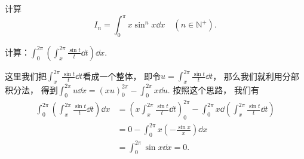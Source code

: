 \begin{example}
计算\[
	I_n = \int_0^\pi x \sin^n x \dd{x}
	\quad(n\in\mathbb{N}^+).
\]
\end{example}

\begin{example}
计算：\(\int_0^{2\pi}\left(\int_x^{2\pi}\frac{\sin t}{t}\dd{t}\right)\dd{x}\).
\begin{solution}
这里我们把\(\int_x^{2\pi}\frac{\sin t}{t}\dd{t}\)看成一个整体，
即令\(u = \int_x^{2\pi}\frac{\sin t}{t}\dd{t}\)，
那么我们就利用分部积分法，
得到\(\int_0^{2\pi} u \dd{x} = (x u)_0^{2\pi} - \int_0^{2\pi} x \dd{u}\).
按照这个思路，
我们有\begin{align*}
	\int_0^{2\pi}\left(\int_x^{2\pi}\frac{\sin t}{t}\dd{t}\right)\dd{x}
	&= \left(x \int_x^{2\pi}\frac{\sin t}{t}\dd{t}\right)_0^{2\pi}
	- \int_0^{2\pi} x \dd(\int_x^{2\pi}\frac{\sin t}{t}\dd{t}) \\
	&= 0 - \int_0^{2\pi} x \left(-\frac{\sin x}{x}\right) \dd{x} \\
	&= \int_0^{2\pi} \sin x \dd{x} = 0.
\end{align*}
\end{solution}
\end{example}
